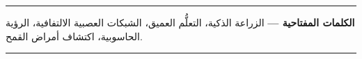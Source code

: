 \vspace{0.1cm}
\hspace*{0mm}\rule{\linewidth}{1pt}
\vspace{0.1cm}
\begin{RLtext}
\noindent\textbf{الكلمات المفتاحية —} الزراعة الذكية، التعلُّم العميق، الشبكات العصبية الالتفافية، الرؤية الحاسوبية، اكتشاف أمراض القمح.
\end{RLtext}
\vspace{0.1cm}
\rule{\linewidth}{1pt}















